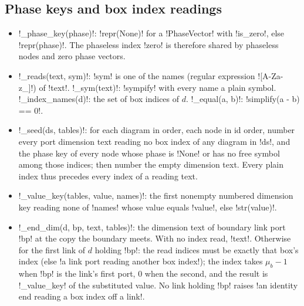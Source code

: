 {{{\subsection{Phase keys and box index readings}\label{sec:lean-export-readings}

\begin{itemize}
\item \lexpy!_phase_key(phase)!: \lexpy!repr(None)! for a \lexpy!PhaseVector! with \lexpy!is_zero!, else
\lexpy!repr(phase)!. The phaseless index \lexlean!zero! is therefore shared by phaseless nodes and zero
phase vectors.
\item \lexpy!_reads(text, sym)!: \lexcode!sym! is one of the names (regular expression
\lexcode![A-Za-z_]\w*!) of \lexcode!text!. \lexpy!_sym(text)!: \lexpy!sympify! with every name a plain
symbol. \lexpy!_index_names(d)!: the set of box indices of $d$. \lexpy!_equal(a, b)!:
\lexpy!simplify(a - b) == 0!.
\item \lexpy!_seed(ds, tables)!: for each diagram in order, each node in id order, number every port
dimension text reading no box index of any diagram in \lexcode!ds!, and the phase key of every node
whose phase is \lexpy!None! or has no free symbol among those indices; then number the empty
dimension text. Every plain index thus precedes every index of a reading text.
\item \lexpy!_value_key(tables, value, names)!: the first nonempty numbered dimension key reading
none of \lexcode!names! whose value equals \lexcode!value!, else \lexpy!str(value)!.
\item \lexpy!_end_dim(d, bp, text, tables)!: the dimension text of boundary link port \lexcode!bp! at
the copy the boundary meets. With no index read, \lexcode!text!. Otherwise for the first link of $d$
holding \lexcode!bp!: the read indices must be exactly that box's index (else
\lexcode!a link port reading another box index!); the index takes $\mu_b - 1$ when \lexcode!bp! is the
link's first port, $0$ when the second, and the result is \lexpy!_value_key! of the substituted
value. No link holding \lexcode!bp! raises \lexcode!an identity end reading a box index off a link!.
\end{itemize}

}}}
